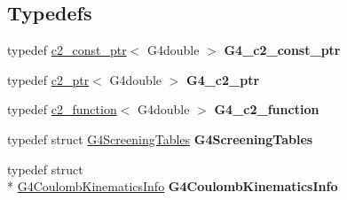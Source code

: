\subsection*{Typedefs}
\begin{DoxyCompactItemize}
\item 
\hypertarget{G4ScreenedNuclearRecoil_8hh_a1252ac0bd90119ed9cc3298296b77c2a}{typedef \hyperlink{classc2__const__ptr}{c2\-\_\-const\-\_\-ptr}$<$ G4double $>$ {\bfseries G4\-\_\-c2\-\_\-const\-\_\-ptr}}\label{G4ScreenedNuclearRecoil_8hh_a1252ac0bd90119ed9cc3298296b77c2a}

\item 
\hypertarget{G4ScreenedNuclearRecoil_8hh_a54f93f48440e736bf99cf574ecf80385}{typedef \hyperlink{classc2__ptr}{c2\-\_\-ptr}$<$ G4double $>$ {\bfseries G4\-\_\-c2\-\_\-ptr}}\label{G4ScreenedNuclearRecoil_8hh_a54f93f48440e736bf99cf574ecf80385}

\item 
\hypertarget{G4ScreenedNuclearRecoil_8hh_a679aa602c6cfde1625601e0314b3cc01}{typedef \hyperlink{classc2__function}{c2\-\_\-function}$<$ G4double $>$ {\bfseries G4\-\_\-c2\-\_\-function}}\label{G4ScreenedNuclearRecoil_8hh_a679aa602c6cfde1625601e0314b3cc01}

\item 
\hypertarget{G4ScreenedNuclearRecoil_8hh_a666b683a8ba6d3adac86c945213451df}{typedef struct \hyperlink{structG4ScreeningTables}{G4\-Screening\-Tables} {\bfseries G4\-Screening\-Tables}}\label{G4ScreenedNuclearRecoil_8hh_a666b683a8ba6d3adac86c945213451df}

\item 
\hypertarget{G4ScreenedNuclearRecoil_8hh_abcbdcc66cc22345eafcf940632ea37bc}{typedef struct \\*
\hyperlink{structG4CoulombKinematicsInfo}{G4\-Coulomb\-Kinematics\-Info} {\bfseries G4\-Coulomb\-Kinematics\-Info}}\label{G4ScreenedNuclearRecoil_8hh_abcbdcc66cc22345eafcf940632ea37bc}

\end{DoxyCompactItemize}

